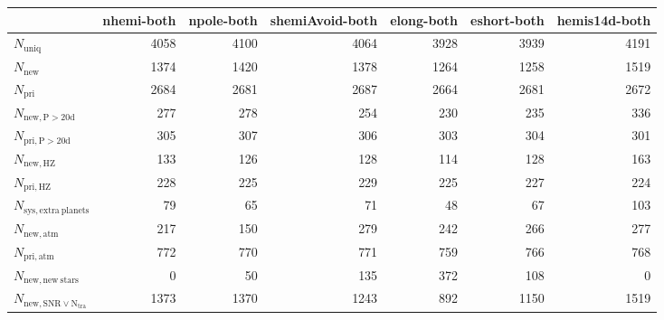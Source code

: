 \begin{tabular}{lrrrrrr}
\toprule
{} &  nhemi-both &  npole-both &  shemiAvoid-both &  elong-both &  eshort-both &  hemis14d-both \\
\midrule
$N_{\mathrm{uniq}}$                &        4058 &        4100 &             4064 &        3928 &         3939 &           4191 \\
$N_{\mathrm{new}}$                 &        1374 &        1420 &             1378 &        1264 &         1258 &           1519 \\
$N_{\mathrm{pri}}$                 &        2684 &        2681 &             2687 &        2664 &         2681 &           2672 \\
$N_{\mathrm{new,P>20d}}$           &         277 &         278 &              254 &         230 &          235 &            336 \\
$N_{\mathrm{pri,P>20d}}$           &         305 &         307 &              306 &         303 &          304 &            301 \\
$N_{\mathrm{new,HZ}}$              &         133 &         126 &              128 &         114 &          128 &            163 \\
$N_{\mathrm{pri,HZ}}$              &         228 &         225 &              229 &         225 &          227 &            224 \\
$N_{\mathrm{sys,extra\ planets}}$  &          79 &          65 &               71 &          48 &           67 &            103 \\
$N_{\mathrm{new,atm}}$             &         217 &         150 &              279 &         242 &          266 &            277 \\
$N_{\mathrm{pri,atm}}$             &         772 &         770 &              771 &         759 &          766 &            768 \\
$N_{\mathrm{new,new\ stars}}$      &           0 &          50 &              135 &         372 &          108 &              0 \\
$N_{\mathrm{new,SNR\lor N_{tra}}}$ &        1373 &        1370 &             1243 &         892 &         1150 &           1519 \\
\bottomrule
\end{tabular}
